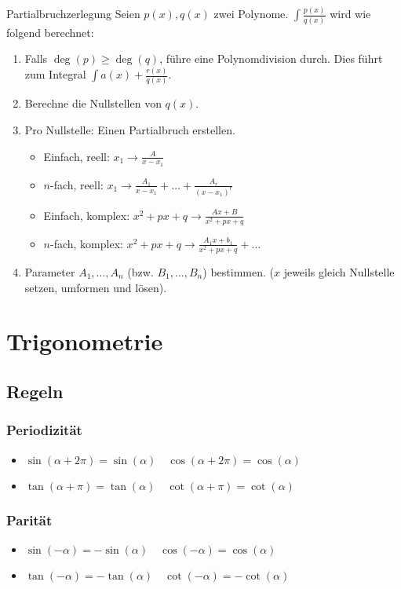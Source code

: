 \documentclass[a4paper,10pt]{article}
\begin{document}
\begin{mainbox}{Partialbruchzerlegung}
 Seien $p(x), q(x)$ zwei Polynome. $\int \frac{p(x)}{q(x)}$ wird wie folgend berechnet:
 \begin{enumerate}
  \item Falls $\deg(p) \ge \deg(q)$, führe eine Polynomdivision durch. Dies führt zum Integral $\int a(x) + \frac{r(x)}{q(x)}$.
  \item Berechne die Nullstellen von $q(x)$.
  \item Pro Nullstelle: Einen Partialbruch erstellen.
  \begin{itemize}[left=0pt]
   \item Einfach, reell: $x_1 \to \frac{A}{x - x_1}$
   \item $n$-fach, reell: $x_1 \to \frac{A_1}{x - x_1} + \ldots + \frac{A_r}{(x-x_1)^r}$ 
   \item Einfach, komplex: $x^2 + px + q \to \frac{Ax + B} {x^2 + px + q}$
   \item $n$-fach, komplex: $x^2 + px + q \to \frac{A_1x+b_1}{x^2+px+q} + \ldots$
  \end{itemize}
  \item Parameter $A_1, \ldots, A_n$ (bzw. $B_1, \ldots, B_n$) bestimmen. ($x$ jeweils gleich Nullstelle setzen, umformen und lösen).

 \end{enumerate}

\end{mainbox}


\section{Trigonometrie}

\subsection{Regeln}
\subsubsection{Periodizität}
\begin{itemize}
 \item $\sin(\alpha + 2 \pi) = \sin(\alpha) \quad \cos(\alpha + 2 \pi) = \cos(\alpha)$
 \item $\tan(\alpha + \pi) = \tan(\alpha) \quad \cot(\alpha + \pi) = \cot(\alpha)$
\end{itemize}

\subsubsection{Parität}
\begin{itemize}
 \item $\sin(-\alpha) = - \sin(\alpha) \quad \cos(-\alpha) = \cos(\alpha)$
 \item $\tan(-\alpha) = - \tan(\alpha) \quad \cot(-\alpha) = - \cot(\alpha)$
\end{itemize}
\end{document}
